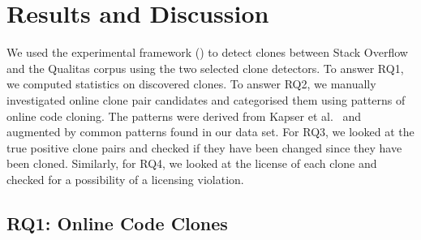\documentclass[sigconf,review, anonymous]{acmart}
\begin{document}
\section{Results and Discussion}

We used the experimental framework () to
detect clones between Stack Overflow and the Qualitas corpus using the
two selected clone detectors. To answer RQ1, we computed statistics on
discovered clones. To answer RQ2, we manually investigated online
clone pair candidates and categorised them using patterns of online
code cloning. The patterns were derived from Kapser et
al.~\cite{Kapser2003} and augmented by common patterns found in our
data set. For RQ3, we looked at the true positive clone pairs and
checked if they have been changed since they have been
cloned. Similarly, for RQ4, we looked at the license of each
clone and checked for a possibility of a licensing violation.

\subsection{RQ1: Online Code Clones} 

\begin{table}
	\centering
	\caption{Statistics of online clones reported by Simian (\textit{S}) and NiCad (\textit{N}) with default (\textit{D}) and EvaClone (\textit{E}) configurations}
	\label{tab:raw_stats}
	\small
\end{table}
\end{document}
